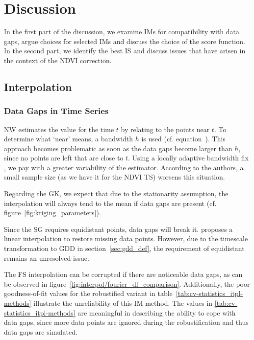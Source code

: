 \chapter{Discussion}\label{sec:discussion}
    In the first part of the discussion, we examine IMs for compatibility with data gaps, argue choices for selected IMs and discuss the choice of the score function. In the second part, we identify the best IS and discuss issues that have arisen in the context of the NDVI correction.


\section{Interpolation}{ \label{sec:discussion_itpl}
    \subsection{Data Gaps in Time Series}\label{sec:discussion_itpl_data_gaps}{
        NW estimates the value for the time $t$ by relating to the points near $t$. To determine what `near' means, a bandwidth $h$ is used (cf. equation~). This approach becomes problematic as soon as the data gaps become larger than $h$, since no points are left that are close to $t$. Using a locally adaptive bandwidth fix \citep{brockmannLocallyAdaptiveBandwidth1993}, we pay with a greater variability of the estimator. According to the authors, a small sample size (as we have it for the NDVI TS) worsens this situation. 

        Regarding the GK, we expect that due to the stationarity assumption, the interpolation will always tend to the mean if data gaps are present (cf. figure~\ref{fig:kriging_parameters}). 

        Since the SG requires equidistant points, data gaps will break it. \cite{chenSimpleMethodReconstructing2004a} proposes a linear interpolation to restore missing data points. However, due to the timescale transformation to GDD in section~\ref{sec:gdd_def}, the requirement of equidistant remains an unresolved issue.

        The FS interpolation can be corrupted if there are noticeable data gaps, as can be observed in figure~\ref{fig:interpol/fourier_dl_comparison}.  Additionally, the poor goodness-of-fit values for the robustified variant in table~\ref{tab:cv-statistics_itpl-methods} illustrate the unreliability of this IM method.
        The values in \ref{tab:cv-statistics_itpl-methods} are meaningful in describing the ability to cope with data gaps, since more data points are ignored during the robustification and thus data gaps are simulated. 

}}
